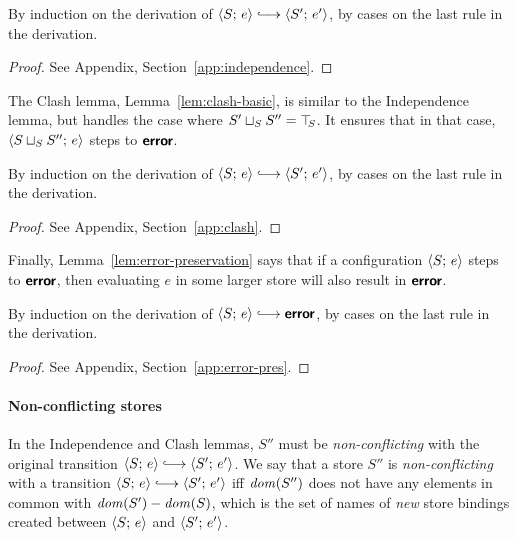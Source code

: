 \LemIndependenceBasic

\ifx\fulltr\undefined
\begin{proofsketch}
  By induction on the derivation of $\config{S}{e}
  \parstepsto \config{S'}{e'}$, by cases on the last rule in the
  derivation.
\end{proofsketch}
\else
\begin{proof}
See Appendix, Section~\ref{app:independence}.
\end{proof}
\fi

\noindent The Clash lemma, Lemma~\ref{lem:clash-basic}, is similar to the
Independence lemma, but handles the case where $S' \sqcup_{S} S'' =
\top\hspace{-0.85mm}_{S}$.  It ensures that in that case, $\langle S \sqcup_{S} S'';\, e \rangle$
steps to $\textbf{\textsf{error}}$.

\LemClashBasic
\ifx\fulltr\undefined
\begin{proofsketch}
  By induction on the derivation of $\config{S}{e}
  \parstepsto \config{S'}{e'}$, by cases on the last rule in the
  derivation.
\end{proofsketch}
\else
\begin{proof}
See Appendix, Section~\ref{app:clash}.
\end{proof}
\fi

\noindent Finally, Lemma~\ref{lem:error-preservation} says that if a
configuration $\langle S;\, e \rangle$ steps to $\textbf{\textsf{error}}$, then evaluating $e$
in some larger store will also result in $\textbf{\textsf{error}}$.

\LemErrorPreservation
\ifx\fulltr\undefined
\begin{proofsketch}
  By induction on the derivation of $\config{S}{e}
  \parstepsto \error$, by cases on the last rule in the derivation.
\end{proofsketch}
\else
\begin{proof}
See Appendix, Section~\ref{app:error-pres}.
\end{proof}
\fi

\paragraph{Non-conflicting stores}

In the Independence and Clash lemmas, $S''$ must be \emph{non-conflicting} with
the original transition $\config{S}{e} \parstepsto \config{S'}{e'}$.
We say that a store $S''$ is \emph{non-conflicting} with a
transition $\config{S}{e} \parstepsto \config{S'}{e'}$ iff $\mathit{dom}(S'')$
does not have any elements in common with $\mathit{dom}(S') - \mathit{dom}(S)$, which
is the set of names of \emph{new} store bindings created between
$\langle S;\, e \rangle$ and $\langle S';\, e' \rangle$.

